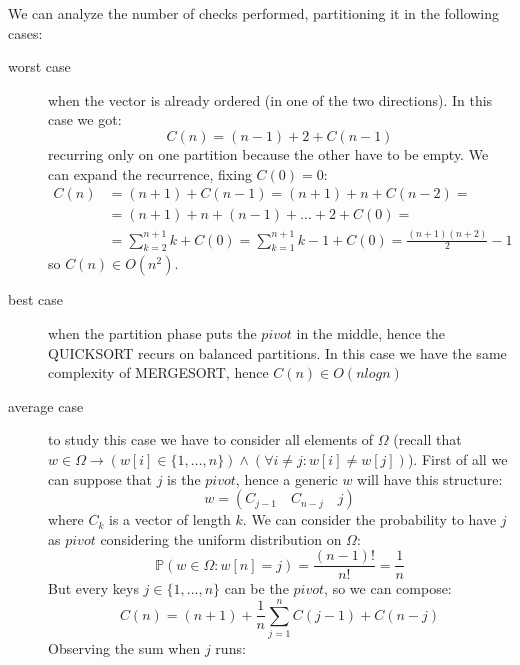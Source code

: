 We can analyze the number of checks performed, partitioning it in the
following cases:
\begin{description}
\item[worst case] when the vector is already ordered (in one of the
  two directions). In this case we got:
  \begin{displaymath}
    C(n) = (n-1)+2 + C(n-1)
  \end{displaymath}
  recurring only on one partition because the other have to be
  empty. We can expand the recurrence, fixing $C(0) = 0$:
  \begin{displaymath}
    \begin{split}
      C(n) &= (n+1) + C(n-1) = (n+1) + n + C(n-2) = \\
      &= (n+1) + n + (n-1) + \ldots + 2 + C(0) = \\
      &= \sum_{k=2}^{n+1}{k} + C(0) = \sum_{k=1}^{n+1}{k} -1 + C(0) =
      \frac{(n+1)(n+2)}{2} - 1
    \end{split}
  \end{displaymath}
  so $C(n) \in O(n^2)$.
\item[best case] when the partition phase puts the $pivot$ in the
  middle, hence the QUICKSORT recurs on balanced partitions. In this
  case we have the same complexity of MERGESORT, hence $C(n) \in O(n
  logn)$
\item[average case] to study this case we have to consider all
  elements of $\Omega$ (recall that $w \in \Omega \rightarrow (w[i]\in
  \{1,\ldots,n\}) \wedge (\forall i\not =j: w[i]\not=w[j])$). First of
  all we can suppose that $j$ is the $pivot$, hence a generic $w$ will
  have this structure:
  \begin{displaymath}
    w = (C_{j-1} \quad C_{n-j} \quad j)
  \end{displaymath}
  where $C_k$ is a vector of length $k$. We can consider the
  probability to have $j$ as $pivot$ considering the uniform
  distribution on $\Omega$:
  \begin{displaymath}
    \mathbb{P}\left(w\in\Omega: w[n]=j \right) =
    \frac{(n-1)!}{n!} =  \frac{1}{n} 
  \end{displaymath}
  But every keys $j \in \{1,\ldots,n\}$ can be the $pivot$, so we can
  compose:
  \begin{displaymath}
    C(n) = (n+1) +  \frac{1}{n}\sum_{j=1}^{n}{C(j-1) + C(n-j)} 
  \end{displaymath}
  Observing the sum when $j$ runs:
  \begin{displaymath}
    \begin{split}

\end{split}
\end{displaymath}
\end{description}
